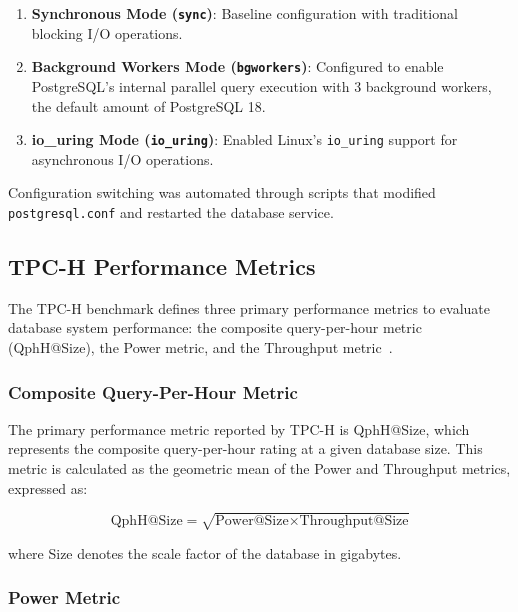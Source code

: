 \documentclass[conference]{IEEEtran}
\begin{document}
\begin{enumerate}
    \item \textbf{Synchronous Mode (\texttt{sync})}: Baseline configuration with traditional blocking I/O operations.

    \item \textbf{Background Workers Mode (\texttt{bgworkers})}: Configured to enable PostgreSQL's internal parallel query execution with 3 background workers, the default amount of PostgreSQL 18.

    \item \textbf{io\_uring Mode (\texttt{io\_uring})}: Enabled Linux's \texttt{io\_uring} support for asynchronous I/O operations.
\end{enumerate}



Configuration switching was automated through scripts that modified \texttt{postgresql.conf} and restarted the database service.

\subsection{TPC-H Performance Metrics}

The TPC-H benchmark defines three primary performance metrics to evaluate database system performance: the composite query-per-hour metric (QphH@Size), the Power metric, and the Throughput metric~\cite{TPC-H-3.0.1}.

\subsubsection{Composite Query-Per-Hour Metric}

The primary performance metric reported by TPC-H is QphH@Size, which represents the composite query-per-hour rating at a given database size. This metric is calculated as the geometric mean of the Power and Throughput metrics, expressed as:

\begin{equation}
\text{QphH@Size} = \sqrt{\text{Power@Size} \times \text{Throughput@Size}}
\end{equation}

where Size denotes the scale factor of the database in gigabytes.

\subsubsection{Power Metric}
\end{document}
